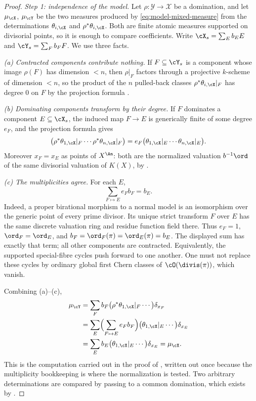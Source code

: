 \begin{proof}
\emph{Step 1: independence of the model.}  Let $\rho:\mathcal Y\to\mathcal
X$ be a domination, and let $\mu_{\cX}$, $\mu_{\cY}$ be the two
measures produced by \eqref{eq:model-mixed-measure} from the determinations
$\theta_{i,\cX}$ and $\rho^*\theta_{i,\cX}$.  Both are finite atomic
measures supported on divisorial points, so it is enough to compare
coefficients.  Write $\cX_s=\sum_Eb_EE$ and $\cY_s=\sum_Fb_FF$.  We use
three facts.

\emph{(a) Contracted components contribute nothing.}  If $F\subseteq\cY_s$
is a component whose image $\rho(F)$ has dimension $<n$, then
$\rho|_F$ factors through a projective $k$-scheme of dimension $<n$, so
the product of the $n$ pulled-back classes
$\rho^*\theta_{i,\cX}|_F$ has degree $0$ on $F$ by the projection
formula .

\emph{(b) Dominating components transform by their degree.}  If $F$
dominates a component $E\subseteq\cX_s$, the induced map $F\to E$ is
generically finite of some degree $e_F$, and the projection formula gives
\[
 \bigl(\rho^*\theta_{1,\cX}|_F\cdots\rho^*\theta_{n,\cX}|_F\bigr)
 =e_F\bigl(\theta_{1,\cX}|_E\cdots\theta_{n,\cX}|_E\bigr).
\]
Moreover $x_F=x_E$ as points of $X^{\An}$: both are the normalized
valuation $b^{-1}\ord$ of the same divisorial valuation of $K(X)$, by
.

\emph{(c) The multiplicities agree.}  For each $E$,
\[
                \sum_{F\mapsto E}e_Fb_F=b_E .
\]
Indeed, a proper birational morphism to a normal model is an isomorphism
over the generic point of every prime divisor.  Its unique strict transform
$F$ over $E$ has the same discrete valuation ring and residue function
field there.  Thus $e_F=1$, $\ord_F=\ord_E$, and
$b_F=\ord_F(\pi)=\ord_E(\pi)=b_E$.
The displayed sum has exactly that term; all other components are
contracted.  Equivalently, the supported special-fibre cycles push forward
to one another.  One must not replace these cycles by ordinary global
first Chern classes of $\cO(\divis(\pi))$, which vanish.

Combining (a)--(c),
\[
 \begin{aligned}
 \mu_{\cY}
 &=\sum_Fb_F\bigl(\rho^*\theta_{1,\cX}|_F\cdots\bigr)\delta_{x_F}\\
 &=\sum_E\Bigl(\sum_{F\mapsto E}e_Fb_F\Bigr)
   \bigl(\theta_{1,\cX}|_E\cdots\bigr)\delta_{x_E}\\
 &=\sum_Eb_E\bigl(\theta_{1,\cX}|_E\cdots\bigr)\delta_{x_E}
  =\mu_{\cX}.
 \end{aligned}
\]
This is the computation carried out in the proof of
, written out once because the multiplicity
bookkeeping is where the normalization is tested.  Two arbitrary
determinations are compared by passing to a common domination, which exists
by .


\end{proof}
